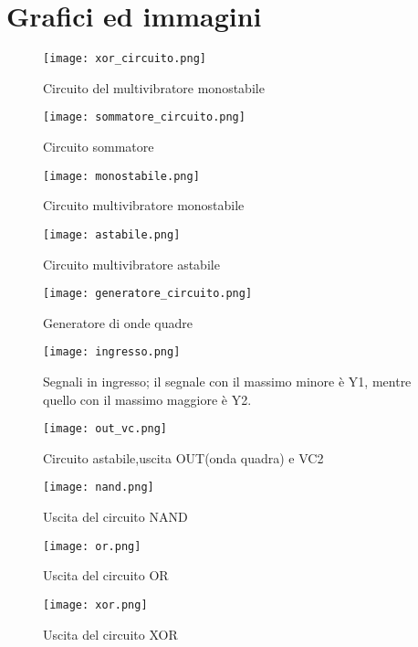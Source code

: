 \section{Grafici ed immagini}
\begin{figure}[h]
	\centering
	\texttt{[image: xor\_circuito.png]}
	\caption{Circuito del multivibratore monostabile}
	\label{f:xor_circuito}
\end{figure}
\begin{figure}[h]
	\centering
	\texttt{[image: sommatore\_circuito.png]}
	\caption{Circuito sommatore}
	\label{f:sommatore_circuito}
\end{figure}
\begin{figure}[h]
	\centering
	\texttt{[image: monostabile.png]}
	\caption{Circuito multivibratore monostabile}
	\label{f:monostabile}
\end{figure}

\begin{figure}[h]
	\centering
	\texttt{[image: astabile.png]}
	\caption{Circuito multivibratore astabile}
	\label{f:astabile}
\end{figure}
\begin{figure}[h]
	\centering
	\texttt{[image: generatore\_circuito.png]}
	\caption{Generatore di onde quadre}
	\label{f:generatore_circuito}
\end{figure}

\begin{figure}[h]
	\centering
	\texttt{[image: ingresso.png]}
	\caption{Segnali in ingresso; il segnale con il massimo minore è Y1, mentre quello con il massimo maggiore è Y2.}
	\label{f:ingressi}
\end{figure}
\begin{figure}[h]
	\centering
	\texttt{[image: out\_vc.png]}
	\caption{Circuito astabile,uscita OUT(onda quadra) e VC2}
	\label{f:astabile_out_vc}
\end{figure}

\begin{figure}[h]
	\centering
	\texttt{[image: nand.png]}
	\caption{Uscita del circuito NAND}
	\label{f:NAND}
\end{figure}

\begin{figure}[h]
	\centering
	\texttt{[image: or.png]}
	\caption{Uscita del circuito OR}
	\label{f:OR}
\end{figure}

\begin{figure}[h]
	\centering
	\texttt{[image: xor.png]}
	\caption{Uscita del circuito XOR}
	\label{f:XOR}
\end{figure}

